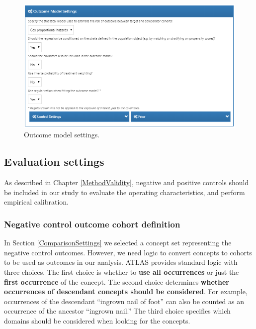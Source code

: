 \documentclass[11pt]{book}
\theoremstyle{definition}
\theoremstyle{definition}
\theoremstyle{definition}
\theoremstyle{remark}
\begin{document}
\begin{figure}

{\centering \includegraphics[width=1\linewidth]{images/PopulationLevelEstimation/outcomeModelSettings} 

}

\caption{Outcome model settings.}\label{fig:outcomeModelSettings}
\end{figure}

\hypertarget{evaluationSettings}{%
\subsection{Evaluation settings}\label{evaluationSettings}}

As described in Chapter \ref{MethodValidity}, negative and positive controls should be included in our study to evaluate the operating characteristics, and perform empirical calibration.

\hypertarget{negative-control-outcome-cohort-definition}{%
\subsubsection*{Negative control outcome cohort definition}\label{negative-control-outcome-cohort-definition}}

In Section \ref{ComparisonSettings} we selected a concept set representing the negative control outcomes. However, we need logic to convert concepts to cohorts to be used as outcomes in our analysis. ATLAS provides standard logic with three choices. The first choice is whether to \textbf{use all occurrences} or just the \textbf{first occurrence} of the concept. The second choice determines \textbf{whether occurrences of descendant concepts should be considered}. For example, occurrences of the descendant ``ingrown nail of foot'' can also be counted as an occurrence of the ancestor ``ingrown nail.'' The third choice specifies which domains should be considered when looking for the concepts.
\end{document}
